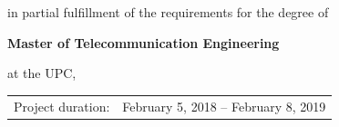 \begin{titlepage}
\begin{center}
\bigskip
\bigskip

{\makeatletter
\titlefont\Large\@author
\makeatother}

\bigskip
\bigskip

in partial fulfillment of the requirements for the degree of

\bigskip
\bigskip

{\bfseries Master of Telecommunication Engineering}

\bigskip
\bigskip

at the UPC,


\vfill

\begin{tabular}{lll}
    Project duration: & \multicolumn{2}{l}{February 5, 2018 -- February 8, 2019} \\
       
\end{tabular}


\end{center}
\end{titlepage}

